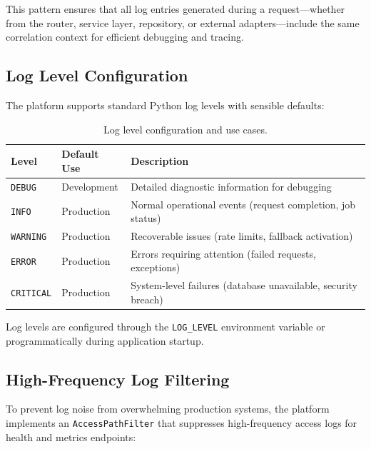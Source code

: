 This pattern ensures that all log entries generated during a request---whether from the router, service layer, repository, or external adapters---include the same correlation context for efficient debugging and tracing.

\subsection{Log Level Configuration}

The platform supports standard Python log levels with sensible defaults:

\begin{table}[ht]
\centering
\caption{Log level configuration and use cases.}
\label{tab:log-levels}
\begin{tabular}{llp{7cm}}
\hline
\textbf{Level} & \textbf{Default Use} & \textbf{Description} \\
\hline
\texttt{DEBUG} & Development & Detailed diagnostic information for debugging \\
\texttt{INFO} & Production & Normal operational events (request completion, job status) \\
\texttt{WARNING} & Production & Recoverable issues (rate limits, fallback activation) \\
\texttt{ERROR} & Production & Errors requiring attention (failed requests, exceptions) \\
\texttt{CRITICAL} & Production & System-level failures (database unavailable, security breach) \\
\hline
\end{tabular}
\end{table}

Log levels are configured through the \texttt{LOG\_LEVEL} environment variable or programmatically during application startup.

\subsection{High-Frequency Log Filtering}

To prevent log noise from overwhelming production systems, the platform implements an \texttt{AccessPathFilter} that suppresses high-frequency access logs for health and metrics endpoints:

